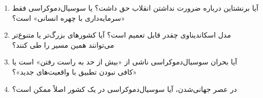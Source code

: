 \vspace{5pt}

\begin{questionbox}

\begin{enumerate}[nosep, rightmargin=1cm]
    \item آیا برنشتاین درباره ضرورت نداشتن انقلاب حق داشت؟ یا سوسیال‌دموکراسی فقط «سرمایه‌داری با چهره انسانی» است؟

    \item مدل اسکاندیناوی چقدر قابل تعمیم است؟ آیا کشورهای بزرگ‌تر یا متنوع‌تر می‌توانند همین مسیر را طی کنند؟

    \item آیا بحران سوسیال‌دموکراسی ناشی از «بیش از حد به راست رفتن» است یا «کافی نبودن تطبیق با واقعیت‌های جدید»؟

    \item در عصر جهانی‌شدن، آیا سوسیال‌دموکراسی در یک کشور اصلاً ممکن است؟
\end{enumerate}

\end{questionbox}

